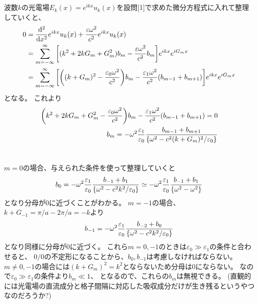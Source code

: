 \documentclass[../ap_2008.tex]{subfiles}
\begin{document}
\section{}
波数\(k\)の光電場\(E_k(x)=e^{ikx}u_k(x)\)を設問[1]で求めた微分方程式に入れて整理していくと、
\begin{equation}\begin{aligned}[b]
    0&=\dv[2]{x}e^{ikx}u_k(x)+\frac{\varepsilon \omega^2}{c^2}e^{ikx}u_k(x)\\
    &=\sum_{m=-\infty}^{\infty}\qty[(k^2+2kG_m+G_m^2)b_m-\frac{\varepsilon\omega^2}{c^2}b_m]e^{ikx}e^{iG_mx}\\
    &=\sum_{m=-\infty}^{\infty}\qty[
        \qty((k+G_m)^2-\frac{\varepsilon_0\omega^2}{c^2})b_m
        -\frac{\varepsilon_1\omega^2}{c^2}(b_{m-1}+b_{m+1})]e^{ikx}e^{iG_mx}
\end{aligned}\end{equation}
となる。
これより
\begin{equation}\begin{aligned}[b]
    \qty(k^2+2kG_m+G_m^2-\frac{\varepsilon_0\omega^2}{c^2})b_m
        -\frac{\varepsilon_1\omega^2}{c^2}(b_{m-1}+b_{m+1}) =0\\
        b_m = -\omega^2\frac{\varepsilon_1}{\varepsilon_0}\frac{b_{m-1}+b_{m+1}}{\qty{\omega^2-c^2(k+G_m)^2/\varepsilon_0}}
\end{aligned}\end{equation}

\section{}
\(m=0\)の場合、与えられた条件を使って整理していくと
\begin{equation}\begin{aligned}[b]
    b_0 = -\omega^2\frac{\varepsilon_1}{\varepsilon_0}\frac{b_{-1}+b_{1}}{\qty{\omega^2-c^2k^2/\varepsilon_0}}
    \simeq -\omega^2\frac{\varepsilon_1}{\varepsilon_0}\frac{b_{-1}+b_{1}}{\qty{\omega^2-\omega^2}}
\end{aligned}\end{equation}
となり分母が0に近づくことがわかる。
\(m=-1\)の場合、\(k+G_{-1}=\pi/a-2\pi/a = -k\)より
\begin{equation}\begin{aligned}[b]
    b_{-1} = -\omega^2\frac{\varepsilon_1}{\varepsilon_0}\frac{b_{-2}+b_{0}}{\qty{\omega^2-c^2k^2/\varepsilon_0}}
\end{aligned}\end{equation}
となり同様に分母が0に近づく。
これら\(m=0,-1\)のときは\(\varepsilon_0\gg\varepsilon_1\)の条件と合わせると、
\(0/0\)の不定形になることから、\(b_0,b_{-1}\)は考慮しなければならない。
\(m\neq 0,-1\)の場合には\((k+G_m)^2 = k^2\)とならないため分母は0にならない。
なので\(\varepsilon_0\gg\varepsilon_1\)の条件より\(b_m\ll 1\)、
となるので、これらの\(b_m\)は無視できる。
(直観的には光電場の直流成分と格子間隔に対応した吸収成分だけが生き残るというやつなのだろうか?)
\end{document}
